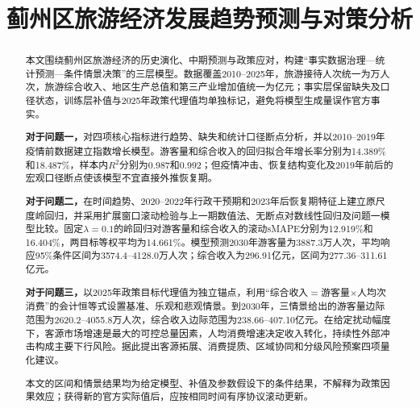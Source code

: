 \documentclass[withoutpreface,bwprint]{cumcmthesis}
\title{蓟州区旅游经济发展趋势预测与对策分析}  %
\begin{document}
	
\maketitle
\pagestyle{fiveSchoolFront}
\thispagestyle{fiveSchoolFront}
\begin{abstract}

本文围绕蓟州区旅游经济的历史演化、中期预测与政策应对，构建“事实数据治理—统计预测—条件情景决策”的三层模型。数据覆盖2010--2025年，旅游接待人次统一为万人次，旅游综合收入、地区生产总值和第三产业增加值统一为亿元；事实层保留缺失及口径状态，训练层补值与2025年政策代理值均单独标记，避免将模型生成量误作官方事实。

\textbf{对于问题一，}对四项核心指标进行趋势、缺失和统计口径断点分析，并以2010--2019年疫情前数据建立指数增长模型。游客量和综合收入的回归拟合年增长率分别为14.389\%和18.487\%，样本内$R^2$分别为0.987和0.992；但疫情冲击、恢复结构变化及2019年前后的宏观口径断点使该模型不宜直接外推恢复期。

\textbf{对于问题二，}在时间趋势、2020--2022年行政干预期和2023年后恢复期特征上建立原尺度岭回归，并采用扩展窗口滚动检验与上一期数值法、无断点对数线性回归及问题一模型比较。固定$\lambda=0.1$的岭回归对游客量和综合收入的滚动sMAPE分别为12.919\%和16.404\%，两目标等权平均为14.661\%。模型预测2030年游客量为3887.3万人次，平均响应95\%条件区间为3574.4--4128.0万人次；综合收入为296.91亿元，区间为277.36--311.61亿元。

\textbf{对于问题三，}以2025年政策目标代理值为独立锚点，利用“综合收入$=$游客量$\times$人均次消费”的会计恒等式设置基准、乐观和悲观情景。到2030年，三情景给出的游客量边际范围为2620.2--4055.8万人次，综合收入边际范围为238.66--407.10亿元。在给定扰动幅度下，客源市场增速是最大的可控总量因素，人均消费增速决定收入转化，持续性外部冲击构成主要下行风险。据此提出客源拓展、消费提质、区域协同和分级风险预案四项量化建议。

本文的区间和情景结果均为给定模型、补值及参数假设下的条件结果，不解释为政策因果效应；获得新的官方实际值后，应按相同时间有序协议滚动更新。


\end{abstract}


\thispagestyle{fiveSchoolFront}
\tableofcontents  %
\clearpage
\pagestyle{fiveSchoolBody}
\thispagestyle{fiveSchoolBody}
\end{document}
